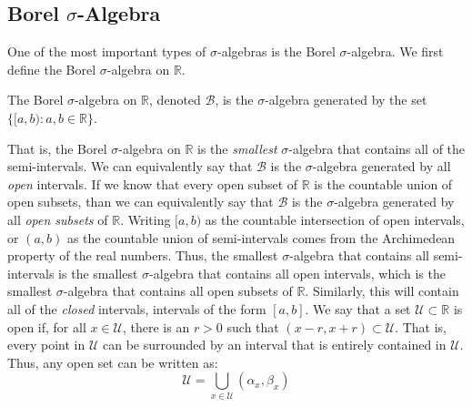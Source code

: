             \subsection{Borel \texorpdfstring{$\sigma$}{Sigma}-Algebra}
                One of the most important types of $\sigma$-algebras
                is the Borel $\sigma$-algebra. We first define the
                Borel $\sigma$-algebra on $\mathbb{R}$.
                \begin{definition}
                    The Borel $\sigma$-algebra on $\mathbb{R}$, denoted
                    $\mathcal{B}$, is the $\sigma$-algebra generated
                    by the set $\{[a,b):a,b\in\mathbb{R}\}$.
                \end{definition}
                That is, the Borel $\sigma$-algebra on $\mathbb{R}$ is
                the \textit{smallest} $\sigma$-algebra that contains
                all of the semi-intervals. We can equivalently say that
                $\mathcal{B}$ is the $\sigma$-algebra generated by all
                \textit{open} intervals. If we know that every open
                subset of $\mathbb{R}$ is the countable union of open
                subsets, than we can equivalently say that
                $\mathcal{B}$ is the $\sigma$-algebra generated by all
                \textit{open subsets} of $\mathbb{R}$. Writing $[a,b)$
                as the countable intersection of open intervals, or
                $(a,b)$ as the countable union of semi-intervals comes
                from the Archimedean property of the real numbers.
                Thus, the smallest $\sigma$-algebra that contains all
                semi-intervals is the smallest $\sigma$-algebra that
                contains all open intervals, which
                is the smallest $\sigma$-algebra that contains all open
                subsets of $\mathbb{R}$. Similarly, this will contain all
                of the \textit{closed} intervals, intervals of the form
                $[a,b]$. We say that a set $\mathcal{U}\subset\mathbb{R}$
                is open if, for all $x\in\mathcal{U}$, there is an $r>0$
                such that $(x-r,x+r)\subset\mathcal{U}$. That is, every
                point in $\mathcal{U}$ can be surrounded by an interval
                that is entirely contained in $\mathcal{U}$. Thus, any
                open set can be written as:
                \begin{equation}
                    \mathcal{U}=
                        \bigcup_{x\in\mathcal{U}}(\alpha_{x},\beta_{x})
                \end{equation}
